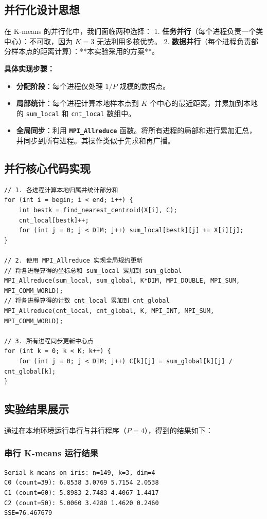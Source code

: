 \documentclass[11pt,a4paper]{article}
\begin{document}
\subsection{并行化设计思想}
在 K-means 的并行化中，我们面临两种选择：
1. \textbf{任务并行}（每个进程负责一个类中心）：不可取，因为 $K=3$ 无法利用多核优势。
2. \textbf{数据并行}（每个进程负责部分样本点的距离计算）：**本实验采用的方案**。

\textbf{具体实现步骤：}
\begin{itemize}
    \item \textbf{分配阶段}：每个进程仅处理 $1/P$ 规模的数据点。
    \item \textbf{局部统计}：每个进程计算本地样本点到 $K$ 个中心的最近距离，并累加到本地的 \texttt{sum\_local} 和 \texttt{cnt\_local} 数组中。
    \item \textbf{全局同步}：利用 \textbf{\texttt{MPI\_Allreduce}} 函数。将所有进程的局部和进行累加汇总，并同步到所有进程。其操作类似于先求和再广播。
\end{itemize}

\subsection{并行核心代码实现}
\begin{lstlisting}[caption={并行 K-means 数据规约逻辑 (mpikmeans.c)}]
// 1. 各进程计算本地归属并统计部分和
for (int i = begin; i < end; i++) {
    int bestk = find_nearest_centroid(X[i], C);
    cnt_local[bestk]++;
    for (int j = 0; j < DIM; j++) sum_local[bestk][j] += X[i][j];
}

// 2. 使用 MPI_Allreduce 实现全局规约更新
// 将各进程算得的坐标总和 sum_local 累加到 sum_global
MPI_Allreduce(sum_local, sum_global, K*DIM, MPI_DOUBLE, MPI_SUM, MPI_COMM_WORLD);
// 将各进程算得的计数 cnt_local 累加到 cnt_global
MPI_Allreduce(cnt_local, cnt_global, K, MPI_INT, MPI_SUM, MPI_COMM_WORLD);

// 3. 所有进程同步更新中心点
for (int k = 0; k < K; k++) {
    for (int j = 0; j < DIM; j++) C[k][j] = sum_global[k][j] / cnt_global[k];
}
\end{lstlisting}

\subsection{实验结果展示}
通过在本地环境运行串行与并行程序（$P=4$），得到的结果如下：

\subsubsection{串行 K-means 运行结果}
\begin{lstlisting}[backgroundcolor=\color{backcolour}]
Serial k-means on iris: n=149, k=3, dim=4
C0 (count=39): 6.8538 3.0769 5.7154 2.0538
C1 (count=60): 5.8983 2.7483 4.4067 1.4417
C2 (count=50): 5.0060 3.4280 1.4620 0.2460
SSE=76.467679
\end{lstlisting}
\end{document}
